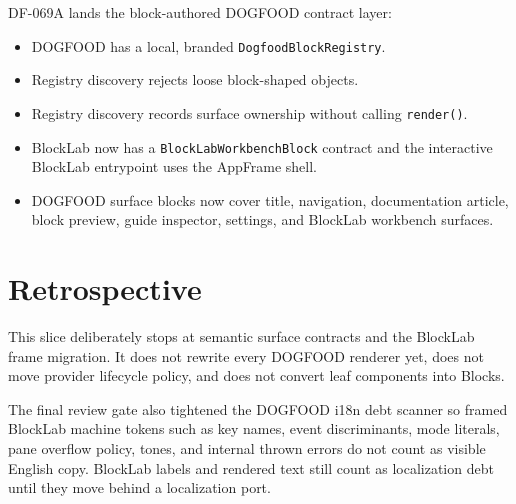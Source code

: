 DF-069A lands the block-authored DOGFOOD contract layer:

\begin{itemize}
\tightlist
\item
  DOGFOOD has a local, branded \texttt{D\allowbreak{}o\allowbreak{}g\allowbreak{}f\allowbreak{}o\allowbreak{}o\allowbreak{}d\allowbreak{}B\allowbreak{}l\allowbreak{}o\allowbreak{}c\allowbreak{}k\allowbreak{}R\allowbreak{}e\allowbreak{}g\allowbreak{}i\allowbreak{}s\allowbreak{}t\allowbreak{}r\allowbreak{}y}.
\item
  Registry discovery rejects loose block-shaped objects.
\item
  Registry discovery records surface ownership without calling \texttt{r\allowbreak{}e\allowbreak{}n\allowbreak{}d\allowbreak{}e\allowbreak{}r\allowbreak{}(\allowbreak{})}.
\item
  BlockLab now has a \texttt{B\allowbreak{}l\allowbreak{}o\allowbreak{}c\allowbreak{}k\allowbreak{}L\allowbreak{}a\allowbreak{}b\allowbreak{}W\allowbreak{}o\allowbreak{}r\allowbreak{}k\allowbreak{}b\allowbreak{}e\allowbreak{}n\allowbreak{}c\allowbreak{}h\allowbreak{}B\allowbreak{}l\allowbreak{}o\allowbreak{}c\allowbreak{}k} contract and the interactive BlockLab entrypoint uses the AppFrame shell.
\item
  DOGFOOD surface blocks now cover title, navigation, documentation article, block preview, guide inspector, settings, and BlockLab workbench surfaces.
\end{itemize}

\section{Retrospective}\label{record-109-retrospective}

This slice deliberately stops at semantic surface contracts and the BlockLab frame migration. It does not rewrite every DOGFOOD renderer yet, does not move provider lifecycle policy, and does not convert leaf components into Blocks.

The final review gate also tightened the DOGFOOD i18n debt scanner so framed BlockLab machine tokens such as key names, event discriminants, mode literals, pane overflow policy, tones, and internal thrown errors do not count as visible English copy. BlockLab labels and rendered text still count as localization debt until they move behind a localization port.

